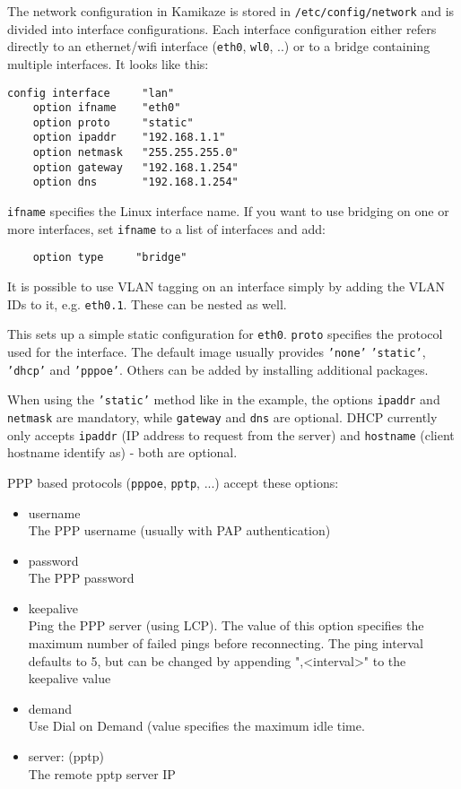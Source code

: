 The network configuration in Kamikaze is stored in \texttt{/etc/config/network}
and is divided into interface configurations.
Each interface configuration either refers directly to an ethernet/wifi
interface (\texttt{eth0}, \texttt{wl0}, ..) or to a bridge containing multiple interfaces.
It looks like this:

\begin{Verbatim}
config interface     "lan"
    option ifname    "eth0"
    option proto     "static"
    option ipaddr    "192.168.1.1"
    option netmask   "255.255.255.0"
    option gateway   "192.168.1.254"
    option dns       "192.168.1.254"
\end{Verbatim}

\texttt{ifname} specifies the Linux interface name.
If you want to use bridging on one or more interfaces, set \texttt{ifname} to a list
of interfaces and add:
\begin{Verbatim}
    option type     "bridge"
\end{Verbatim}

It is possible to use VLAN tagging on an interface simply by adding the VLAN IDs
to it, e.g. \texttt{eth0.1}. These can be nested as well.

This sets up a simple static configuration for \texttt{eth0}. \texttt{proto} specifies the
protocol used for the interface. The default image usually provides \texttt{'none'}
\texttt{'static'}, \texttt{'dhcp'} and \texttt{'pppoe'}. Others can be added by installing additional
packages.

When using the \texttt{'static'} method like in the example, the  options \texttt{ipaddr} and
\texttt{netmask} are mandatory, while \texttt{gateway} and \texttt{dns} are optional.
DHCP currently only accepts \texttt{ipaddr} (IP address to request from the server)
and \texttt{hostname} (client hostname identify as) - both are optional.

PPP based protocols (\texttt{pppoe}, \texttt{pptp}, ...) accept these options:
\begin{itemize}
    \item{username} \\
        The PPP username (usually with PAP authentication)
    \item{password} \\
        The PPP password
    \item{keepalive} \\
        Ping the PPP server (using LCP). The value of this option
        specifies the maximum number of failed pings before reconnecting.
        The ping interval defaults to 5, but can be changed by appending
        ",<interval>" to the keepalive value
    \item{demand} \\
        Use Dial on Demand (value specifies the maximum idle time.

    \item{server: (pptp)} \\
        The remote pptp server IP
\end{itemize}

